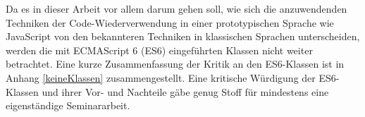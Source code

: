 \skippingparagraph

{\smaller
Da es in dieser Arbeit vor allem darum gehen soll, wie sich die anzuwendenden Techniken der Code-Wiederverwendung in einer prototypischen Sprache wie JavaScript von den bekannteren Techniken in klassischen Sprachen unterscheiden, werden die mit ECMAScript 6 (ES6) eingeführten Klassen nicht weiter betrachtet. Eine kurze Zusammenfassung der Kritik an den ES6-Klassen ist in Anhang \ref{keineKlassen} zusammengestellt. Eine kritische Würdigung der ES6-Klassen und ihrer Vor- und Nachteile gäbe genug Stoff für mindestens eine eigenständige Seminararbeit.
}



%
%
%
%
%

